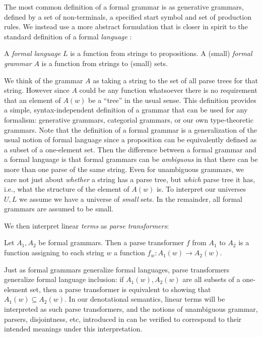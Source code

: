 \documentclass[acmsmall,nonacm]{acmart}
\begin{document}
{The most common definition of a formal grammar is as generative
grammars, defined by a set of non-terminals, a specified start symbol
and set of production rules. We instead use a more abstract
formulation that is closer in spirit to the standard definition of a
formal \emph{language} \cite{elliottSymbolicAutomaticDifferentiation2021}:
\begin{definition}
  A \emph{formal language} $L$ is a function from strings to propositions.
  A (small) \emph{formal grammar} $A$ is a function from strings to (small) sets.
\end{definition}
We think of the grammar $A$ as taking a string to the set of all parse
trees for that string. However since $A$ could be any function
whatsoever there is no requirement that an element of $A(w)$ be a
``tree'' in the usual sense. This definition provides a simple,
syntax-independent definition of a grammar that can be used for any
formalism: generative grammars, categorial grammars, or our own
type-theoretic grammars. Note that the definition of a formal grammar
is a generalization of the usual notion of formal language since a
proposition can be equivalently defined as a subset of a one-element
set. Then the difference between a formal grammar and a formal
language is that formal grammars can be \emph{ambiguous} in that there
can be more than one parse of the same string. Even for unambiguous
grammars, we care not just about \emph{whether} a string has a parse
tree, but \emph{which} parse tree it has, i.e., what the structure of
the element of $A(w)$ is.  To interpret our universes $U , L$ we
assume we have a universe of \emph{small} sets. In the remainder, all
formal grammars are assumed to be small.

We then interpret linear \emph{terms} as \emph{parse transformers}:
\begin{definition}
  Let $A_1,A_2$ be formal grammars. Then a parse transformer $f$ from
  $A_1$ to $A_2$ is a function assigning to each string $w$ a function
  $f_w : A_1(w) \to A_2(w)$.
\end{definition}
Just as formal grammars generalize formal languages, parse
transformers generalize formal language inclusion: if $A_1(w), A_2(w)$
are all subsets of a one-element set, then a parse transformer is
equivalent to showing that $A_1(w) \subseteq A_2(w)$. In our
denotational semantics, linear terms will be interpreted as such parse
transformers, and the notions of unambiguous grammar, parsers,
disjointness, etc, introduced in  can be
verified to correspond to their intended meanings under this
interpretation.

}
\end{document}
